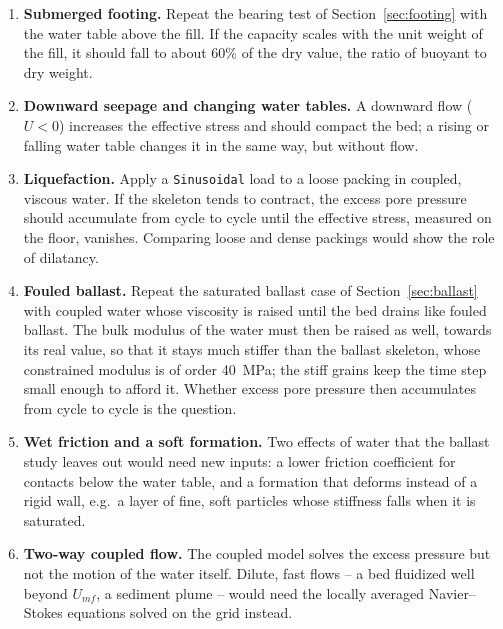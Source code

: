 \begin{enumerate}[leftmargin=2.2em]
        water and compare the packings.  Drag slows the particles before
        impact, which should change the area fraction, the coordination number
        and the stiffness of the packing.
  \item \textbf{Submerged footing.}  Repeat the bearing test of
        Section~\ref{sec:footing} with the water table above the fill.  If the
        capacity scales with the unit weight of the fill, it should fall to
        about \num{60}\% of the dry value, the ratio of buoyant to dry weight.
  \item \textbf{Downward seepage and changing water tables.}  A downward flow
        ($U<0$) increases the effective stress and should compact the bed; a
        rising or falling water table changes it in the same way, but without
        flow.
  \item \textbf{Liquefaction.}  Apply a \texttt{Sinusoidal} load to a loose
        packing in coupled, viscous water.  If the skeleton tends to
        contract, the excess pore pressure should accumulate from cycle to cycle
        until the effective stress, measured on the floor, vanishes.  Comparing
        loose and dense packings would show the role of dilatancy.
  \item \textbf{Fouled ballast.}  Repeat the saturated ballast case of
        Section~\ref{sec:ballast} with coupled water whose viscosity is raised
        until the bed drains like fouled ballast.  The bulk modulus of the
        water must then be raised as well, towards its real value, so that it
        stays much stiffer than the ballast skeleton, whose constrained
        modulus is of order \qty{40}{\mega\pascal}; the stiff grains keep the
        time step small enough to afford it.  Whether excess pore pressure
        then accumulates from cycle to cycle is the question.
  \item \textbf{Wet friction and a soft formation.}  Two effects of water that
        the ballast study leaves out would need new inputs: a lower friction
        coefficient for contacts below the water table, and a formation that
        deforms instead of a rigid wall, e.g.\ a layer of fine, soft particles
        whose stiffness falls when it is saturated.
  \item \textbf{Two-way coupled flow.}  The coupled model solves the excess
        pressure but not the motion of the water itself.  Dilute, fast flows --
        a bed fluidized well beyond $U_{mf}$, a sediment plume -- would need the
        locally averaged Navier--Stokes equations solved on the grid instead.
\end{enumerate}
